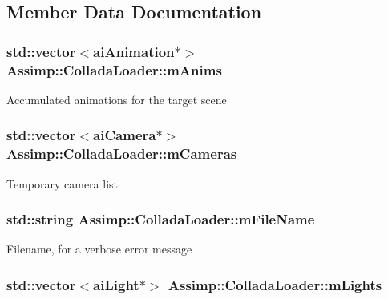 \subsection{Member Data Documentation}
\hypertarget{class_assimp_1_1_collada_loader_a8d166d11cf816cd9a107aa0be4a0bdc1}{
\subsubsection[{m\+Anims}]{\setlength{\rightskip}{0pt plus 5cm}std\+::vector$<${\bf ai\+Animation}$\ast$$>$ Assimp\+::\+Collada\+Loader\+::m\+Anims\hspace{0.3cm}{\ttfamily [protected]}}}\label{class_assimp_1_1_collada_loader_a8d166d11cf816cd9a107aa0be4a0bdc1}
Accumulated animations for the target scene \hypertarget{class_assimp_1_1_collada_loader_ae01b5e7ac7d5b81b39049caf5dcb51b2}{
\subsubsection[{m\+Cameras}]{\setlength{\rightskip}{0pt plus 5cm}std\+::vector$<${\bf ai\+Camera}$\ast$$>$ Assimp\+::\+Collada\+Loader\+::m\+Cameras\hspace{0.3cm}{\ttfamily [protected]}}}\label{class_assimp_1_1_collada_loader_ae01b5e7ac7d5b81b39049caf5dcb51b2}
Temporary camera list \hypertarget{class_assimp_1_1_collada_loader_a07c07f08414391b0684de4651396b5b3}{
\subsubsection[{m\+File\+Name}]{\setlength{\rightskip}{0pt plus 5cm}std\+::string Assimp\+::\+Collada\+Loader\+::m\+File\+Name\hspace{0.3cm}{\ttfamily [protected]}}}\label{class_assimp_1_1_collada_loader_a07c07f08414391b0684de4651396b5b3}
Filename, for a verbose error message \hypertarget{class_assimp_1_1_collada_loader_a5e90b34e54dab83fe030c855afdc6e41}{
\subsubsection[{m\+Lights}]{\setlength{\rightskip}{0pt plus 5cm}std\+::vector$<${\bf ai\+Light}$\ast$$>$ Assimp\+::\+Collada\+Loader\+::m\+Lights\hspace{0.3cm}{\ttfamily [protected]}}}\label{class_assimp_1_1_collada_loader_a5e90b34e54dab83fe030c855afdc6e41}
